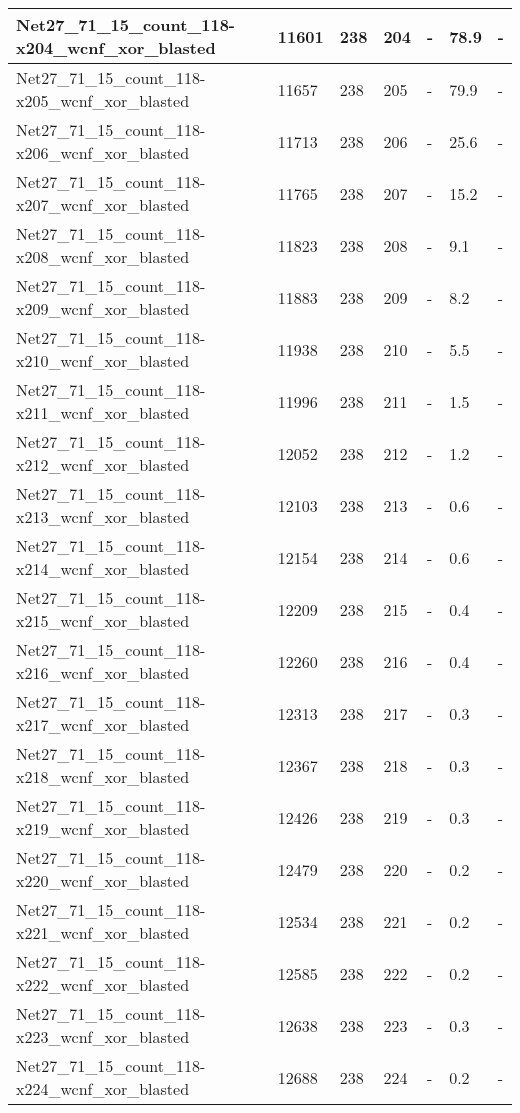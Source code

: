 \begin{scriptsize}
\begin{longtable}{|p{5cm}|l|l|l|l|l|l|}
Net27\_71\_15\_count\_118-x204\_wcnf\_xor\_blasted&11601&238&204&-&78.9&- \\ \hline 
Net27\_71\_15\_count\_118-x205\_wcnf\_xor\_blasted&11657&238&205&-&79.9&- \\ \hline 
Net27\_71\_15\_count\_118-x206\_wcnf\_xor\_blasted&11713&238&206&-&25.6&- \\ \hline 
Net27\_71\_15\_count\_118-x207\_wcnf\_xor\_blasted&11765&238&207&-&15.2&- \\ \hline 
Net27\_71\_15\_count\_118-x208\_wcnf\_xor\_blasted&11823&238&208&-&9.1&- \\ \hline 
Net27\_71\_15\_count\_118-x209\_wcnf\_xor\_blasted&11883&238&209&-&8.2&- \\ \hline 
Net27\_71\_15\_count\_118-x210\_wcnf\_xor\_blasted&11938&238&210&-&5.5&- \\ \hline 
Net27\_71\_15\_count\_118-x211\_wcnf\_xor\_blasted&11996&238&211&-&1.5&- \\ \hline 
Net27\_71\_15\_count\_118-x212\_wcnf\_xor\_blasted&12052&238&212&-&1.2&- \\ \hline 
Net27\_71\_15\_count\_118-x213\_wcnf\_xor\_blasted&12103&238&213&-&0.6&- \\ \hline 
Net27\_71\_15\_count\_118-x214\_wcnf\_xor\_blasted&12154&238&214&-&0.6&- \\ \hline 
Net27\_71\_15\_count\_118-x215\_wcnf\_xor\_blasted&12209&238&215&-&0.4&- \\ \hline 
Net27\_71\_15\_count\_118-x216\_wcnf\_xor\_blasted&12260&238&216&-&0.4&- \\ \hline 
Net27\_71\_15\_count\_118-x217\_wcnf\_xor\_blasted&12313&238&217&-&0.3&- \\ \hline 
Net27\_71\_15\_count\_118-x218\_wcnf\_xor\_blasted&12367&238&218&-&0.3&- \\ \hline 
Net27\_71\_15\_count\_118-x219\_wcnf\_xor\_blasted&12426&238&219&-&0.3&- \\ \hline 
Net27\_71\_15\_count\_118-x220\_wcnf\_xor\_blasted&12479&238&220&-&0.2&- \\ \hline 
Net27\_71\_15\_count\_118-x221\_wcnf\_xor\_blasted&12534&238&221&-&0.2&- \\ \hline 
Net27\_71\_15\_count\_118-x222\_wcnf\_xor\_blasted&12585&238&222&-&0.2&- \\ \hline 
Net27\_71\_15\_count\_118-x223\_wcnf\_xor\_blasted&12638&238&223&-&0.3&- \\ \hline 
Net27\_71\_15\_count\_118-x224\_wcnf\_xor\_blasted&12688&238&224&-&0.2&- \\ \hline 

\end{longtable}
\end{scriptsize}
